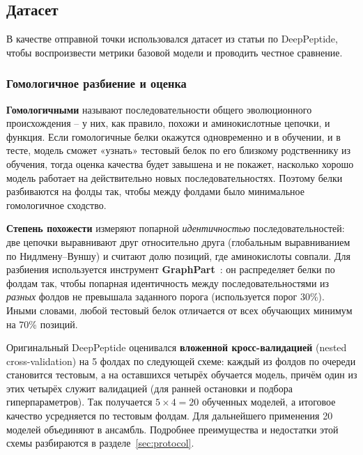\documentclass{article}
\begin{document}
\subsection{Датасет}
В качестве отправной точки использовался датасет из статьи по DeepPeptide, чтобы воспроизвести метрики базовой модели и проводить честное сравнение.

\subsubsection{Гомологичное разбиение и оценка}
\textbf{Гомологичными} называют последовательности общего эволюционного происхождения -- у них, как правило, похожи и аминокислотные цепочки, и функция. Если гомологичные белки окажутся одновременно и в обучении, и в тесте, модель сможет «узнать» тестовый белок по его близкому родственнику из обучения, тогда оценка качества будет завышена и не покажет, насколько хорошо модель работает на действительно новых последовательностях. Поэтому белки разбиваются на фолды так, чтобы между фолдами было минимальное гомологичное сходство.

\textbf{Степень похожести} измеряют попарной \emph{идентичностью} последовательностей: две цепочки выравнивают друг относительно друга (глобальным выравниванием по Нидлмену--Вуншу) и считают долю позиций, где аминокислоты совпали. Для разбиения используется инструмент \textbf{GraphPart}~\cite{graphpart2023}: он распределяет белки по фолдам так, чтобы попарная идентичность между последовательностями из \emph{разных} фолдов не превышала заданного порога (используется порог 30\%). Иными словами, любой тестовый белок отличается от всех обучающих минимум на 70\% позиций.

Оригинальный DeepPeptide оценивался \textbf{вложенной кросс-валидацией} (nested cross-validation) на 5 фолдах по следующей схеме: каждый из фолдов по очереди становится тестовым, а на оставшихся четырёх обучается модель, причём один из этих четырёх служит валидацией (для ранней остановки и подбора гиперпараметров). Так получается $5 \times 4 = 20$ обученных моделей, а итоговое качество усредняется по тестовым фолдам. Для дальнейшего применения 20 моделей объединяют в ансамбль. Подробнее преимущества и недостатки этой схемы разбираются в разделе~\ref{sec:protocol}.
\end{document}
